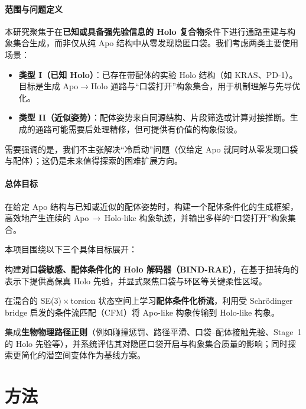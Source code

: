 \documentclass[11pt,a4paper,fontset=fandol]{ctexart}
\begin{document}
\paragraph{范围与问题定义}
本研究聚焦于在\textbf{已知或具备强先验信息的 Holo 复合物}条件下进行通路重建与构象集合生成，而非仅从纯 Apo 结构中从零发现隐匿口袋。我们考虑两类主要使用场景：
\begin{itemize}
    \item \textbf{类型 I（已知 Holo）}：已存在带配体的实验 Holo 结构（如 KRAS、PD-1）。目标是生成 Apo$\to$Holo 通路与“口袋打开”构象集合，用于机制理解与先导优化。
    \item \textbf{类型 II（近似姿势）}：配体姿势来自同源结构、片段筛选或计算对接推断。生成的通路可能需要后处理精修，但可提供有价值的构象假设。
\end{itemize}
需要强调的是，我们不主张解决“冷启动”问题（仅给定 Apo 就同时从零发现口袋与配体）；这仍是未来值得探索的困难扩展方向。

\paragraph{总体目标}
在给定 Apo 结构与已知或近似的配体姿势时，构建一个配体条件化的生成框架，高效地产生连续的 Apo\,$\to$\,Holo-like 构象轨迹，并输出多样的“口袋打开”构象集合。

本项目围绕以下三个具体目标展开：

\begin{description}[style=unboxed, leftmargin=0cm]
    \item[目标 1：] 构建\textbf{对口袋敏感、配体条件化的 Holo 解码器（BIND-RAE）}，在基于扭转角的表示下提供高保真 Holo 先验，并显式聚焦口袋与环区等关键柔性区域。

    \item[目标 2：] 在混合的 SE(3)\,$\times$\,torsion 状态空间上学习\textbf{配体条件化桥流}，利用受 Schrödinger bridge 启发的条件流匹配（CFM）将 Apo-like 构象传输到 Holo-like 构象。

    \item[目标 3：] 集成\textbf{生物物理路径正则}（例如碰撞惩罚、路径平滑、口袋--配体接触先验、Stage~1 的 Holo 先验等），并系统评估其对隐匿口袋开启与构象集合质量的影响；同时探索更简化的潜空间变体作为基线方案。
\end{description}

\section{方法}
\end{document}
